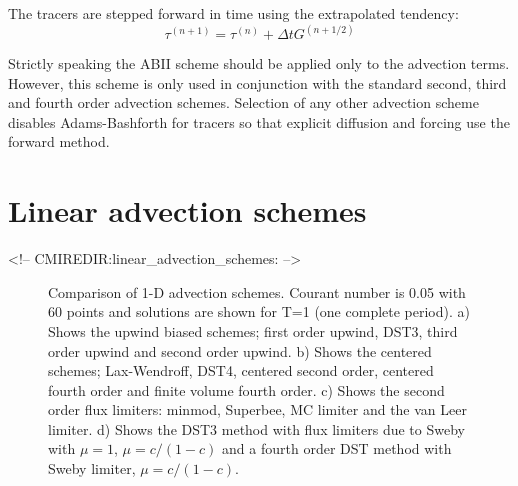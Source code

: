 The tracers are stepped forward in time using the extrapolated tendency:
\begin{equation}
\tau^{(n+1)} = \tau^{(n)} + \Delta t G^{(n+1/2)}
\end{equation}


Strictly speaking the ABII scheme should be applied only to the
advection terms. However, this scheme is only used in conjunction with
the standard second, third and fourth order advection
schemes. Selection of any other advection scheme disables
Adams-Bashforth for tracers so that explicit diffusion and forcing use
the forward method.




\section{Linear advection schemes}
\label{sec:tracer-advection}
\begin{rawhtml}
<!-- CMIREDIR:linear_advection_schemes: -->
\end{rawhtml}

\begin{figure}
\caption{
Comparison of 1-D advection schemes. Courant number is 0.05 with 60
points and solutions are shown for T=1 (one complete period).
a) Shows the upwind biased schemes; first order upwind, DST3,
third order upwind and second order upwind.
b) Shows the centered schemes; Lax-Wendroff, DST4, centered second order,
centered fourth order and finite volume fourth order.
c) Shows the second order flux limiters: minmod, Superbee,
MC limiter and the van Leer limiter.
d) Shows the DST3 method with flux limiters due to Sweby with
$\mu=1$, $\mu=c/(1-c)$ and a fourth order DST method with Sweby limiter,
$\mu=c/(1-c)$.
\label{fig:advect-1d-lo}
}
\end{figure}

